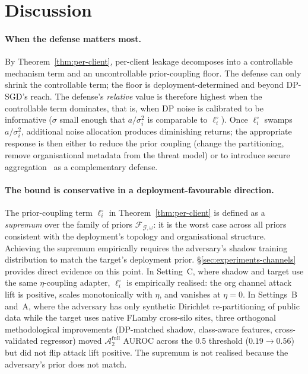 \documentclass[letterpaper,journal]{IEEEtran}
\newcommand{\Adv}{\mathcal{A}}
\newcommand{\TOPO}{\mathcal{G}}
\newcommand{\FAM}{\mathcal{F}}
\begin{document}
\section{Discussion}
\label{sec:discussion}

\paragraph{When the defense matters most.}
By Theorem~\ref{thm:per-client}, per-client leakage decomposes into a
controllable mechanism term and an uncontrollable prior-coupling floor.
The defense can only shrink the controllable term; the floor is
deployment-determined and beyond DP-SGD's reach. The defense's
\emph{relative} value is therefore highest when the controllable term
dominates, that is, when DP noise is calibrated to be informative
($\sigma$ small enough that $a/\sigma_i^2$ is comparable to
$\ell_i^\circ$). Once $\ell_i^\circ$ swamps $a/\sigma_i^2$, additional
noise allocation produces diminishing returns; the appropriate response
is then either to reduce the prior coupling (change the partitioning,
remove organisational metadata from the threat model) or to introduce
secure aggregation~\cite{bonawitz2017secagg} as a complementary
defense.

\paragraph{The bound is conservative in a deployment-favourable direction.}
The prior-coupling term $\ell_i^\circ$ in Theorem~\ref{thm:per-client}
is defined as a \emph{supremum} over the family of priors
$\FAM_{\TOPO,\omega}$: it is the worst case across all priors
consistent with the deployment's topology and organisational structure.
Achieving the supremum empirically requires the adversary's shadow
training distribution to match the target's deployment prior.
\S\ref{sec:experiments-channels} provides direct evidence on this
point. In Setting~C, where shadow and target use the same
$\eta$-coupling adapter, $\ell_i^\circ$ is empirically realised: the
org channel attack lift is positive, scales monotonically with $\eta$,
and vanishes at $\eta = 0$. In Settings~B and~A, where the adversary
has only synthetic Dirichlet re-partitioning of public data while the
target uses native FLamby cross-silo sites, three orthogonal
methodological improvements (DP-matched shadow, class-aware features,
cross-validated regressor) moved $\Adv_2^{\text{full}}$ AUROC across
the 0.5 threshold ($0.19 \to 0.56$) but did not flip attack lift
positive. The supremum is not realised because the adversary's prior
does not match.
\end{document}
